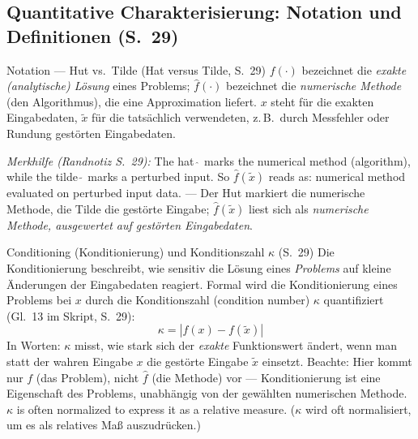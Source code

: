 \subsection{Quantitative Charakterisierung: Notation und Definitionen (S.~29)}

\begin{defbox}{Notation — Hut vs.\ Tilde (Hat versus Tilde, S.~29)}
$f(\cdot)$ bezeichnet die \emph{exakte (analytische) Lösung} eines Problems; $\hat{f}(\cdot)$ bezeichnet die \emph{numerische Methode} (den Algorithmus), die eine Approximation liefert. $x$ steht für die exakten Eingabedaten, $\tilde{x}$ für die tatsächlich verwendeten, z.\,B.\ durch Messfehler oder Rundung gestörten Eingabedaten.

\emph{Merkhilfe (Randnotiz S.~29):} \glqq The hat $\hat{\ }$ marks the numerical method (algorithm), while the tilde $\tilde{\ }$ marks a perturbed input. So $\hat{f}(\tilde{x})$ reads as: numerical method evaluated on perturbed input data.\grqq{} — Der Hut markiert die numerische Methode, die Tilde die gestörte Eingabe; $\hat{f}(\tilde{x})$ liest sich als \emph{numerische Methode, ausgewertet auf gestörten Eingabedaten}.
\end{defbox}

\begin{defbox}{Conditioning (Konditionierung) und Konditionszahl $\kappa$ (S.~29)}
Die Konditionierung beschreibt, wie sensitiv die Lösung eines \emph{Problems} auf kleine Änderungen der Eingabedaten reagiert. Formal wird die Konditionierung eines Problems bei $x$ durch die Konditionszahl (condition number) $\kappa$ quantifiziert (Gl.~13 im Skript, S.~29):
\[ \kappa = \left| f(x) - f(\tilde{x}) \right| \tag{Gl.~13} \]
In Worten: $\kappa$ misst, wie stark sich der \emph{exakte} Funktionswert ändert, wenn man statt der wahren Eingabe $x$ die gestörte Eingabe $\tilde{x}$ einsetzt. Beachte: Hier kommt nur $f$ (das Problem), nicht $\hat{f}$ (die Methode) vor — Konditionierung ist eine Eigenschaft des Problems, unabhängig von der gewählten numerischen Methode. \glqq$\kappa$ is often normalized to express it as a relative measure.\grqq{} ($\kappa$ wird oft normalisiert, um es als relatives Maß auszudrücken.)
\end{defbox}

